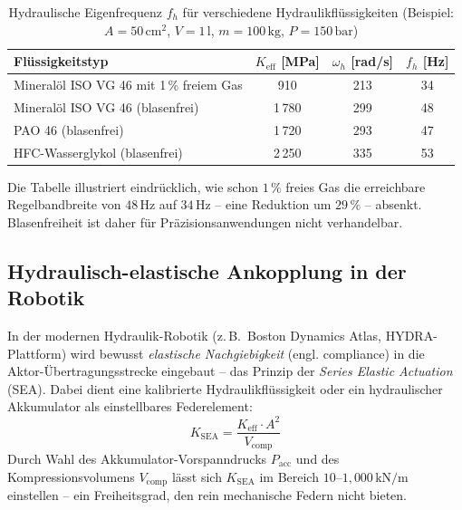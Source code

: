 ﻿\documentclass[a4paper,12pt]{scrreprt}
\theoremstyle{definition}
\begin{document}
\begin{table}[H]
  \centering
  \caption{Hydraulische Eigenfrequenz $f_h$ für verschiedene Hydraulikflüssigkeiten
    (Beispiel: $A = 50\,\mathrm{cm}^2$, $V = 1\,\mathrm{l}$, $m = 100\,\mathrm{kg}$,
    $P = 150\,\mathrm{bar}$)}
  \label{tab:eigenfrequenz}
  \begin{tabular}{lccc}
    \toprule
    Flüssigkeitstyp & $K_{\mathrm{eff}}$ [MPa] & $\omega_h$ [rad/s] & $f_h$ [Hz] \\
    \midrule
    Mineralöl ISO VG 46 mit 1\,\% freiem Gas  &   910 &  213 &  34 \\
    Mineralöl ISO VG 46 (blasenfrei)           & 1\,780 &  299 &  48 \\
    PAO 46 (blasenfrei)                        & 1\,720 &  293 &  47 \\
    HFC-Wasserglykol (blasenfrei)              & 2\,250 &  335 &  53 \\
    \bottomrule
  \end{tabular}
\end{table}

Die Tabelle illustriert eindrücklich, wie schon $1\,\%$ freies Gas die
erreichbare Regelbandbreite von $48\,\mathrm{Hz}$ auf $34\,\mathrm{Hz}$
-- eine Reduktion um $29\,\%$ -- absenkt. Blasenfreiheit ist daher
für Präzisionsanwendungen nicht verhandelbar.

\subsection{Hydraulisch-elastische Ankopplung in der Robotik}

In der modernen Hydraulik-Robotik (z.\,B.\ Boston Dynamics Atlas, HYDRA-Plattform)
wird bewusst \emph{elastische Nachgiebigkeit} (engl. compliance) in die
Aktor-Übertragungsstrecke eingebaut -- das Prinzip der
\emph{Series Elastic Actuation} (SEA). Dabei dient eine kalibrierte
Hydraulikflüssigkeit oder ein hydraulischer Akkumulator als einstellbares
Federelement:
\begin{equation}
  K_{\mathrm{SEA}} = \frac{K_{\mathrm{eff}} \cdot A^2}{V_{\mathrm{comp}}}
  \label{eq:k_sea}
\end{equation}
Durch Wahl des Akkumulator-Vorspanndrucks $P_{\mathrm{acc}}$ und des
Kompressionsvolumens $V_{\mathrm{comp}}$ lässt sich $K_{\mathrm{SEA}}$
im Bereich $10$--$1{,}000\,\mathrm{kN/m}$ einstellen -- ein Freiheitsgrad,
den rein mechanische Federn nicht bieten.

\end{document}
